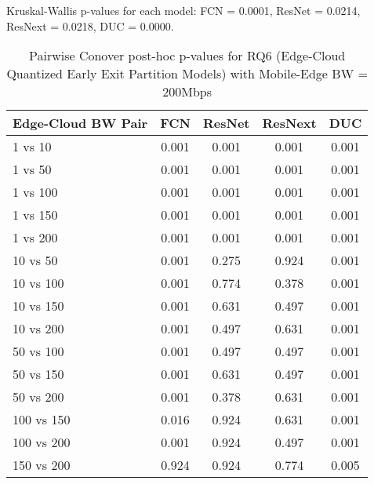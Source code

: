 \begin{table}[h]
\centering
\caption{Pairwise Conover post-hoc p-values for RQ6 (Edge-Cloud Quantized Early Exit Partition Models) with Mobile-Edge BW = 200Mbps}
\label{tab:conover_edge_cloud_quantized_earlyexit_partition_me200}
\smallskip
Kruskal-Wallis p-values for each model: FCN = 0.0001, ResNet = 0.0214, ResNext = 0.0218, DUC = 0.0000.

\begin{tabular}{lcccc}
\toprule
Edge-Cloud BW Pair & FCN & ResNet & ResNext & DUC \\
\midrule
1 vs 10 & 0.001 & 0.001 & 0.001 & 0.001 \\
1 vs 50 & 0.001 & 0.001 & 0.001 & 0.001 \\
1 vs 100 & 0.001 & 0.001 & 0.001 & 0.001 \\
1 vs 150 & 0.001 & 0.001 & 0.001 & 0.001 \\
1 vs 200 & 0.001 & 0.001 & 0.001 & 0.001 \\
10 vs 50 & 0.001 & 0.275 & 0.924 & 0.001 \\
10 vs 100 & 0.001 & 0.774 & 0.378 & 0.001 \\
10 vs 150 & 0.001 & 0.631 & 0.497 & 0.001 \\
10 vs 200 & 0.001 & 0.497 & 0.631 & 0.001 \\
50 vs 100 & 0.001 & 0.497 & 0.497 & 0.001 \\
50 vs 150 & 0.001 & 0.631 & 0.497 & 0.001 \\
50 vs 200 & 0.001 & 0.378 & 0.631 & 0.001 \\
100 vs 150 & 0.016 & 0.924 & 0.631 & 0.001 \\
100 vs 200 & 0.001 & 0.924 & 0.497 & 0.001 \\
150 vs 200 & 0.924 & 0.924 & 0.774 & 0.005 \\
\bottomrule
\end{tabular}
\end{table}

